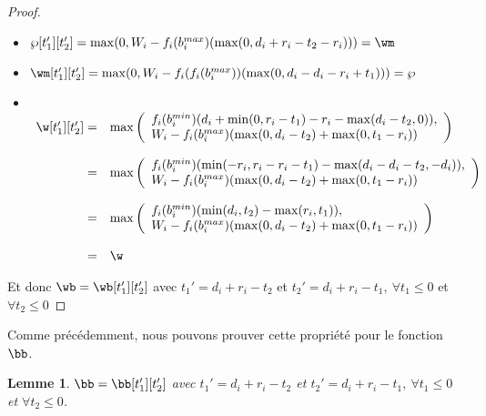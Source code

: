 \documentclass{report}
\newcommand{\bmin}{b_i^{min}}
\newcommand{\bmax}{b_i^{max}}
\newtheorem{Lem}{Lemme}
\begin{document}
\begin{proof}~\\
  \begin{itemize}
  \item $\wp[t_1'][t_2']=\max(0,W_i-f_i(\bmax)(\max(0,d_i+r_i-t_2-r_i)))=\wm$
    \vspace{0.2cm}
  \item $\wm[t_1'][t_2']=\max(0,W_i-f_i(f_i(\bmax))(\max(0,d_i-d_i-r_i+t_1)))=\wp$
    \newpage
  \item ~\\
    $
    \begin{array}{rl}
      \w[t_1'][t_2']=&\max\left(
      \begin{array}{l}
	f_i(\bmin) (d_i+\min(0,r_i-t_1) - r_i- \max(d_i-t_2,0)),\\
	W_i - f_i(\bmax)(\max(0,d_i-t_2) + \max (0,t_1-r_i))
      \end{array}
      \right)\\
      & \\
      = &\max\left(
      \begin{array}{l}
	f_i(\bmin) (\min(-r_i,r_i-r_i-t_1) - \max(d_i-d_i-t_2,-d_i)),\\
	W_i - f_i(\bmax)(\max(0,d_i-t_2) + \max (0,t_1-r_i))
      \end{array}
	\right)\\
	& \\
	= &\max\left(
	\begin{array}{l}
	  f_i(\bmin) (\min(d_i,t_2) - \max(r_i,t_1)),\\
	  W_i - f_i(\bmax)(\max(0,d_i-t_2) + \max (0,t_1-r_i))
	\end{array}
	\right)\\
	& \\
	= & \w
	
    \end{array}$
  \end{itemize}
  Et donc $\wb=\wb[t_1'][t_2']$ avec $t_1'=d_i+r_i-t_2$ et $t_2'=d_i+r_i-t_1,\ \forall t_1 \le 0$ et $\forall t_2 \le 0$
\end{proof}

Comme précédemment, nous pouvons prouver cette propriété pour le fonction $\bb$.

\begin{Lem}
  $\bb=\bb[t_1'][t_2']$ avec $t_1'=d_i+r_i-t_2$ et $t_2'=d_i+r_i-t_1,\ \forall t_1 \le 0$ et $\forall t_2 \le 0$.
\end{Lem}
\end{document}
